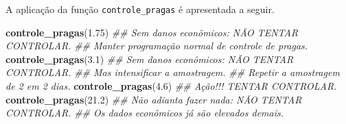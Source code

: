 \documentclass[
  11pt,
  a5paper,
  openany]{book}
\newenvironment{Shaded}{\begin{snugshade}}{\end{snugshade}}
\newcommand{\CommentTok}[1]{\textcolor[rgb]{0.56,0.35,0.01}{\textit{#1}}}
\newcommand{\FloatTok}[1]{\textcolor[rgb]{0.00,0.00,0.81}{#1}}
\newcommand{\KeywordTok}[1]{\textcolor[rgb]{0.13,0.29,0.53}{\textbf{#1}}}
\newcommand{\NormalTok}[1]{#1}
\begin{document}
A aplicação da função \texttt{controle\_pragas} é apresentada a seguir.

\begin{Shaded}
\begin{Highlighting}[]
\KeywordTok{controle_pragas}\NormalTok{(}\FloatTok{1.75}\NormalTok{)}
\CommentTok{## Sem danos econômicos: NÃO TENTAR CONTROLAR.}
\CommentTok{## Manter programação normal de controle de pragas.}
\KeywordTok{controle_pragas}\NormalTok{(}\FloatTok{3.1}\NormalTok{)}
\CommentTok{## Sem danos econômicos: NÃO TENTAR CONTROLAR.}
\CommentTok{## Mas intensificar a amostragem.}
\CommentTok{## Repetir a amostragem de 2 em 2 dias.}
\KeywordTok{controle_pragas}\NormalTok{(}\FloatTok{4.6}\NormalTok{)}
\CommentTok{## Ação!!! TENTAR CONTROLAR.}
\KeywordTok{controle_pragas}\NormalTok{(}\FloatTok{21.2}\NormalTok{)}
\CommentTok{## Não adianta fazer nada: NÃO TENTAR CONTROLAR.}
\CommentTok{## Os dados econômicos já são elevados demais.}
\end{Highlighting}
\end{Shaded}

  
\end{document}
